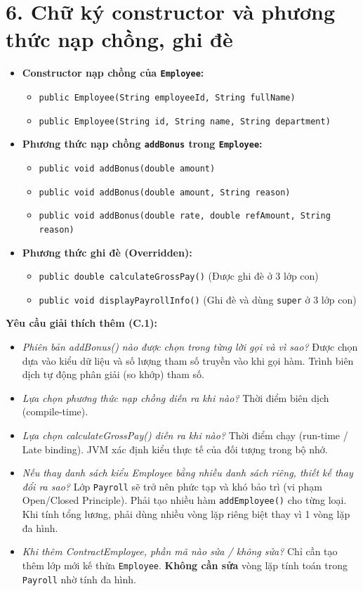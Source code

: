 \documentclass[12pt,a4paper]{article}
\begin{document}
\section{6. Chữ ký constructor và phương thức nạp chồng, ghi đè}
\begin{itemize}
    \item \textbf{Constructor nạp chồng của \texttt{Employee}:}
    \begin{itemize}
        \item \texttt{public Employee(String employeeId, String fullName)}
        \item \texttt{public Employee(String id, String name, String department)}
    \end{itemize}
    \item \textbf{Phương thức nạp chồng \texttt{addBonus} trong \texttt{Employee}:}
    \begin{itemize}
        \item \texttt{public void addBonus(double amount)}
        \item \texttt{public void addBonus(double amount, String reason)}
        \item \texttt{public void addBonus(double rate, double refAmount, String reason)}
    \end{itemize}
    \item \textbf{Phương thức ghi đè (Overridden):}
    \begin{itemize}
        \item \texttt{public double calculateGrossPay()} (Được ghi đè ở 3 lớp con)
        \item \texttt{public void displayPayrollInfo()} (Ghi đè và dùng \texttt{super} ở 3 lớp con)
    \end{itemize}
\end{itemize}

\textbf{Yêu cầu giải thích thêm (C.1):}
\begin{itemize}
    \item \textit{Phiên bản addBonus() nào được chọn trong từng lời gọi và vì sao?} Được chọn dựa vào kiểu dữ liệu và số lượng tham số truyền vào khi gọi hàm. Trình biên dịch tự động phân giải (so khớp) tham số.
    \item \textit{Lựa chọn phương thức nạp chồng diễn ra khi nào?} Thời điểm biên dịch (compile-time).
    \item \textit{Lựa chọn calculateGrossPay() diễn ra khi nào?} Thời điểm chạy (run-time / Late binding). JVM xác định kiểu thực tế của đối tượng trong bộ nhớ.
    \item \textit{Nếu thay danh sách kiểu Employee bằng nhiều danh sách riêng, thiết kế thay đổi ra sao?} Lớp \texttt{Payroll} sẽ trở nên phức tạp và khó bảo trì (vi phạm Open/Closed Principle). Phải tạo nhiều hàm \texttt{addEmployee()} cho từng loại. Khi tính tổng lương, phải dùng nhiều vòng lặp riêng biệt thay vì 1 vòng lặp đa hình.
    \item \textit{Khi thêm ContractEmployee, phần mã nào sửa / không sửa?} Chỉ cần tạo thêm lớp mới kế thừa \texttt{Employee}. \textbf{Không cần sửa} vòng lặp tính toán trong \texttt{Payroll} nhờ tính đa hình.
\end{itemize}
\end{document}
